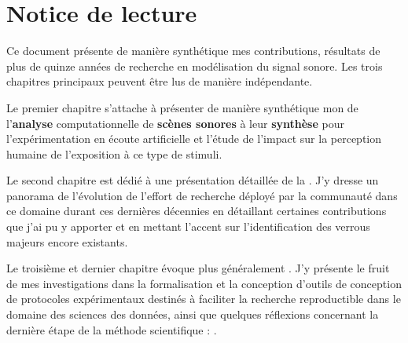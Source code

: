 \chapter{\nmu Notice \nmu de lecture} \label{chap:notice}

Ce document présente de manière synthétique mes contributions, résultats de plus de quinze années de recherche en modélisation du signal sonore. Les trois chapitres principaux peuvent être lus de manière indépendante.

Le premier chapitre s'attache à présenter de manière synthétique mon  de l'\textbf{analyse} computationnelle de \textbf{scènes sonores} à leur \textbf{synthèse} pour l'expérimentation en écoute artificielle et l'étude de l'impact sur la perception humaine de l'exposition à ce type de stimuli.

Le second chapitre est dédié à une présentation détaillée de la . J'y dresse un panorama de l'évolution de l'effort de recherche déployé par la communauté dans ce domaine durant ces dernières décennies en détaillant certaines contributions que j'ai pu y apporter et en mettant l'accent sur l'identification des verrous majeurs encore existants.

Le troisième et dernier chapitre évoque plus généralement . J'y présente le fruit de mes investigations dans la formalisation et la conception d'outils de conception de protocoles expérimentaux destinés à faciliter la recherche reproductible dans le domaine des sciences des données, ainsi que quelques réflexions concernant la dernière étape de la méthode scientifique : .

